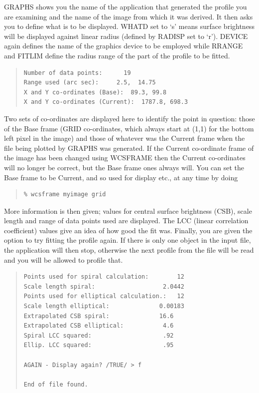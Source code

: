 \documentclass[twoside,11pt]{article}
\newcommand{\xref}[3]{#1}
\newenvironment{myquote}{\begin{quote}\begin{small}}{\end{small}\end{quote}}
\begin{document}
GRAPHS shows you the name of the application that generated the 
profile you are examining and the name of the image from which
it was derived. It then asks you to define what is to be displayed.
WHATD set to `s' means surface brightness will be displayed against
linear radius (defined by RADISP set to `r'). DEVICE again defines the
name of the graphics device to be employed while RRANGE and FITLIM define the
radius range of the part of the profile to be fitted.

\begin{myquote}
\begin{verbatim}
Number of data points:      19
Range used (arc sec):     2.5,  14.75
X and Y co-ordinates (Base):  89.3, 99.8
X and Y co-ordinates (Current):  1787.8, 698.3
\end{verbatim}
\end{myquote}

Two sets of co-ordinates are displayed here to identify the point
in question: those of the Base frame (GRID co-ordinates, which 
always start at (1,1) for the bottom left pixel in the image)
and those of whatever was the Current frame when the
file being plotted by GRAPHS was generated.
If the Current co-ordinate frame of the image has been changed
using \xref{WCSFRAME}{sun95}{WCSFRAME} then the Current co-ordinates
will no longer be correct, but the Base frame ones always will.
You can set the Base frame to be Current, 
and so used for display etc.,
at any time by doing
\begin{myquote}
\begin{verbatim}
% wcsframe myimage grid
\end{verbatim}
\end{myquote}

More information is then given;
values for central surface brightness (CSB), scale length and 
range of data points used are displayed. The LCC (linear correlation
coefficient) values give an idea of how good the fit was. Finally, you are 
given the option to try fitting the profile again. If there is only one 
object in the input file, the application will then stop, otherwise the 
next profile from the file will be read and you will be allowed to profile 
that.

\begin{myquote}
\begin{verbatim}
Points used for spiral calculation:        12
Scale length spiral:                   2.0442
Points used for elliptical calculation.:   12
Scale length elliptical:              0.00183
Extrapolated CSB spiral:              16.6
Extrapolated CSB elliptical:           4.6
Spiral LCC squared:                    .92            
Ellip. LCC squared:                    .95
 
AGAIN - Display again? /TRUE/ > f
 
End of file found.
\end{verbatim}
\end{myquote}
\end{document}
